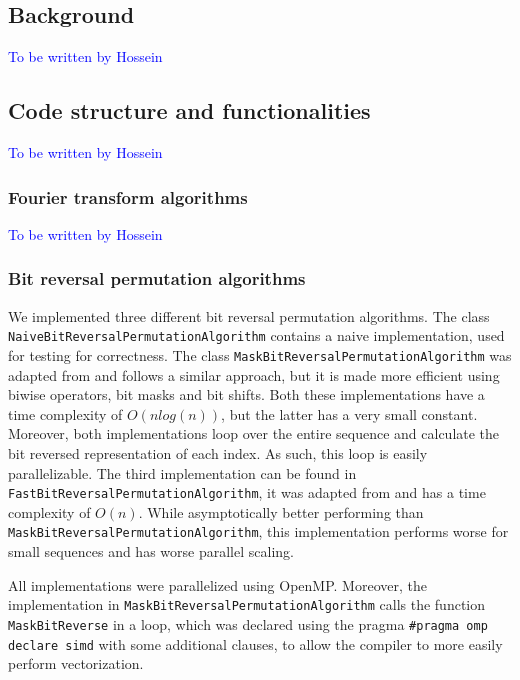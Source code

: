 \subsection{Background}
\textcolor{blue}{To be written by Hossein}

\subsection{Code structure and functionalities}
\textcolor{blue}{To be written by Hossein}

\subsubsection{Fourier transform algorithms}
\textcolor{blue}{To be written by Hossein}

\subsubsection{Bit reversal permutation algorithms}
We implemented three different bit reversal permutation algorithms. The class \texttt{Naive\-Bit\-Reversal\-Permutation\-Algorithm} contains a naive implementation, used for testing for correctness. The class \texttt{Mask\-Bit\-Reversal\-Permutation\-Algorithm} was adapted from \cite{mask_bit_rev} and follows a similar approach, but it is made more efficient using biwise operators, bit masks and bit shifts. Both these implementations have a time complexity of $O(n log(n))$, but the latter has a very small constant. Moreover, both implementations loop over the entire sequence and calculate the bit reversed representation of each index. As such, this loop is easily parallelizable. The third implementation can be found in \texttt{Fast\-Bit\-Reversal\-Permutation\-Algorithm}, it was adapted from \cite{fast_bit_rev} and has a time complexity of $O(n)$. While asymptotically better performing than \texttt{Mask\-Bit\-Reversal\-Permutation\-Algorithm}, this implementation performs worse for small sequences and has worse parallel scaling. 

All implementations were parallelized using OpenMP. Moreover, the implementation in \texttt{Mask\-Bit\-Reversal\-Permutation\-Algorithm} calls the function \texttt{Mask\-Bit\-Reverse} in a loop, which was declared using the pragma \texttt{\#pragma omp declare simd} with some additional clauses, to allow the compiler to more easily perform vectorization.

